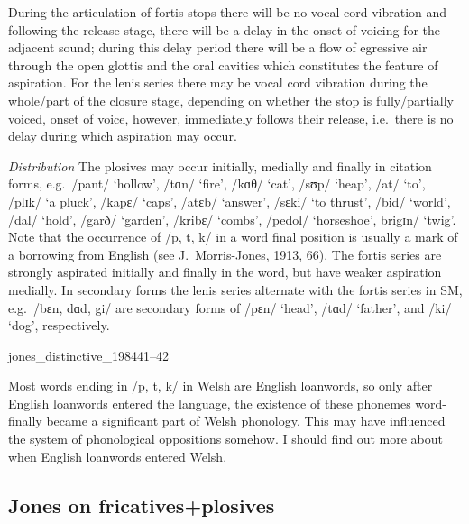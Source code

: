 {During the articulation of fortis stops there will be no vocal cord vibration and following the release stage, there will be a delay in the onset of voicing for the adjacent sound; during this delay period there will be a flow of egressive air through the open glottis and the oral cavities which constitutes the feature of aspiration. For the lenis series there may be vocal cord vibration during the whole/part of the closure stage, depending on whether the stop is fully/partially voiced, onset of voice, however, immediately follows their release, i.e.\ there is no delay during which aspiration may occur.

\textit{Distribution} The plosives may occur initially, medially and finally in citation forms, e.g.\ /pant/ `hollow', /tɑn/ `fire', /kɑθ/ `cat', /sʊp/ `heap', /at/ `to', /plɪk/ `a pluck', /kapɛ/ `caps', /atɛb/ `answer', /sɛki/ `to thrust', /bid/ `world', /dal/ `hold', /garð/ `garden', /kribɛ/ `combs', /pedol/ `horseshoe', brigɪn/ `twig'. Note that the occurrence of /p, t, k/ in a word final position is usually a mark of a borrowing from English (see J.\ Morris-Jones, 1913, 66). The fortis series are strongly aspirated initially and finally in the word, but have weaker aspiration medially. In secondary forms the lenis series alternate with the fortis series in SM, e.g.\ /bɛn, dɑd, gi/ are secondary forms of /pɛn/ `head', /tɑd/ `father', and /ki/ `dog', respectively.}{jones_distinctive_1984}{41--42}

Most words ending in /p, t, k/ in Welsh are English loanwords, so only after English loanwords entered the language, the existence of these phonemes word-finally became a significant part of Welsh phonology. This may have influenced the system of phonological oppositions somehow. I should find out more about when English loanwords entered Welsh.
\subsection{Jones on fricatives+plosives}
